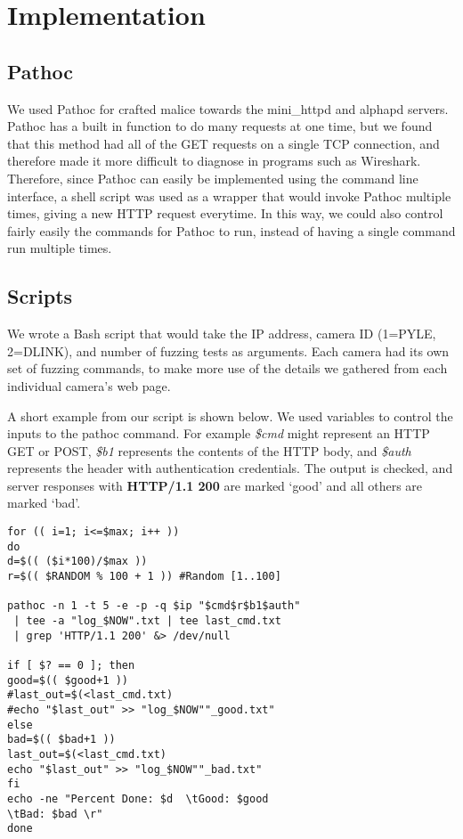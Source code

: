 \documentclass[letterpaper,twocolumn,10pt]{article}
\begin{document}
\section{Implementation}

\subsection{Pathoc}
We used Pathoc for crafted malice towards the mini\_httpd and alphapd servers. Pathoc has a built in function to do many requests at one time, but we found that this method had all of the GET requests on a single TCP connection, and therefore made it more difficult to diagnose in programs such as Wireshark. Therefore, since Pathoc can easily be implemented using the command line interface, a shell script was used as a wrapper that would invoke Pathoc multiple times, giving a new HTTP request everytime. In this way, we could also control fairly easily the commands for Pathoc to run, instead of having a single command run multiple times.



\subsection{Scripts}
We wrote a Bash script that would take the IP address, camera ID (1=PYLE, 2=DLINK), and number of fuzzing tests as arguments. Each camera had its own set of fuzzing commands, to make more use of the details we gathered from each individual camera's web page.

A short example from our script is shown below. We used variables to control the inputs to the pathoc command. For example \textit{\$cmd} might represent an HTTP GET or POST, \textit{\$b1} represents the contents of the HTTP body, and \textit{\$auth} represents the header with authentication credentials. The output is checked, and server responses with \textbf{HTTP/1.1 200} are marked `good' and all others are marked `bad'. 
\begin{verbatim}
for (( i=1; i<=$max; i++ ))
do	
d=$(( ($i*100)/$max ))
r=$(( $RANDOM % 100 + 1 )) #Random [1..100]

pathoc -n 1 -t 5 -e -p -q $ip "$cmd$r$b1$auth"
 | tee -a "log_$NOW".txt | tee last_cmd.txt
 | grep 'HTTP/1.1 200' &> /dev/null

if [ $? == 0 ]; then
good=$(( $good+1 ))
#last_out=$(<last_cmd.txt)
#echo "$last_out" >> "log_$NOW""_good.txt"
else
bad=$(( $bad+1 ))
last_out=$(<last_cmd.txt)
echo "$last_out" >> "log_$NOW""_bad.txt"
fi		
echo -ne "Percent Done: $d  \tGood: $good   
\tBad: $bad \r"
done
\end{verbatim}
\end{document}
